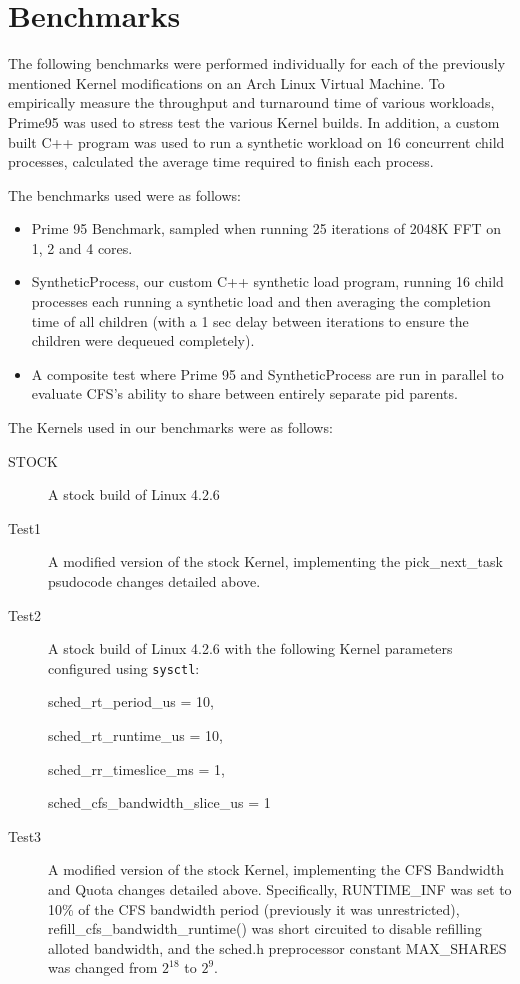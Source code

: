 \section{Benchmarks}

The following benchmarks were performed individually for each of the previously mentioned Kernel modifications on an Arch Linux Virtual Machine. To empirically measure the throughput and turnaround time of various workloads, Prime95 was used to stress test the various Kernel builds. In addition, a custom built C++ program was used to run a synthetic workload on 16 concurrent child processes, calculated the average time required to finish each process.

The benchmarks used were as follows:
\begin{itemize}
	\item Prime 95 Benchmark, sampled when running 25 iterations of 2048K FFT on 1, 2 and 4 cores.
	\item SyntheticProcess, our custom C++ synthetic load program, running 16 child processes each running a synthetic load and then averaging the completion time of all children (with a 1 sec delay between iterations to ensure the children were dequeued completely).
	\item A composite test where Prime 95 and SyntheticProcess are run in parallel to evaluate CFS's ability to share between entirely separate pid parents.
\end{itemize}

\noindent The Kernels used in our benchmarks were as follows:
\begin{description}
	\item[STOCK] A stock build of Linux 4.2.6
	\item[Test1] A modified version of the stock Kernel, implementing the pick\_next\_task psudocode changes detailed above.
	\item[Test2] A stock build of Linux 4.2.6 with the following Kernel parameters configured using \texttt{sysctl}:
	
		sched\_rt\_period\_us = 10,
		
		sched\_rt\_runtime\_us = 10,
		
		sched\_rr\_timeslice\_ms = 1,
		
		sched\_cfs\_bandwidth\_slice\_us = 1
	\item[Test3] A modified version of the stock Kernel, implementing the CFS Bandwidth and Quota changes detailed above. Specifically, RUNTIME\_INF was set to 10\% of the CFS bandwidth period (previously it was unrestricted), refill\_cfs\_bandwidth\_runtime() was short circuited to disable refilling alloted bandwidth, and the sched.h preprocessor constant MAX\_SHARES was changed from $2^{18}$ to $2^9$.
\end{description}

